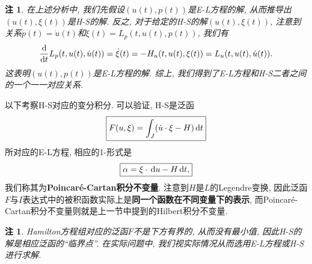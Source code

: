 \documentclass[12pt,a4paper]{article}
\newtheorem{remark}[theorem]{注}
\begin{document}
\begin{remark}
    在上述分析中, 我们先假设$(u(t), p(t))$是E-L方程的解, 从而推导出$(u(t), \xi(t))$是H-S的解.
    反之, 对于给定的H-S的解$(u(t), \xi(t))$, 注意到关系$p(t) = \dot u(t)$和$\xi(t) = L_p(t, u(t), p(t))$, 我们有 
    \begin{equation*}
        \frac{{\rm d}}{{\rm d}t}L_p(t, u(t), \dot u(t)) = \dot\xi(t) = -H_u(t, u(t), \xi(t)) = L_u(t, u(t), \dot u(t)). 
    \end{equation*}
    这表明$(u(t), p(t))$是E-L方程的解. 综上, 我们得到了E-L方程和H-S二者之间的一个一一对应关系.
\end{remark}

以下考察H-S对应的变分积分. 可以验证, H-S是泛函 
\begin{equation*}
    \boxed{F(u, \xi) = \int_J(\dot u \cdot \xi - H) \,{\rm d}t}
\end{equation*}
所对应的E-L方程, 相应的1-形式是 
\begin{equation*}
    \boxed{\alpha = \xi \cdot \,{\rm d}u - H \,{\rm d}t,}
\end{equation*}
我们称其为\textbf{Poincaré-Cartan积分不变量}. 注意到$H$是$L$的Legendre变换, 因此泛函$F$与$I$表达式中的被积函数实际上是\textbf{同一个函数在不同变量下的表示}, 而Poincaré-Cartan积分不变量则就是上一节中提到的Hilbert积分不变量.

\begin{remark}
    Hamilton方程组对应的泛函$F$不是下方有界的, 从而没有最小值, 因此H-S的解是相应泛函的``临界点''.
    在实际问题中, 我们视实际情况从而选用E-L方程或H-S进行求解.
\end{remark}
\end{document}
